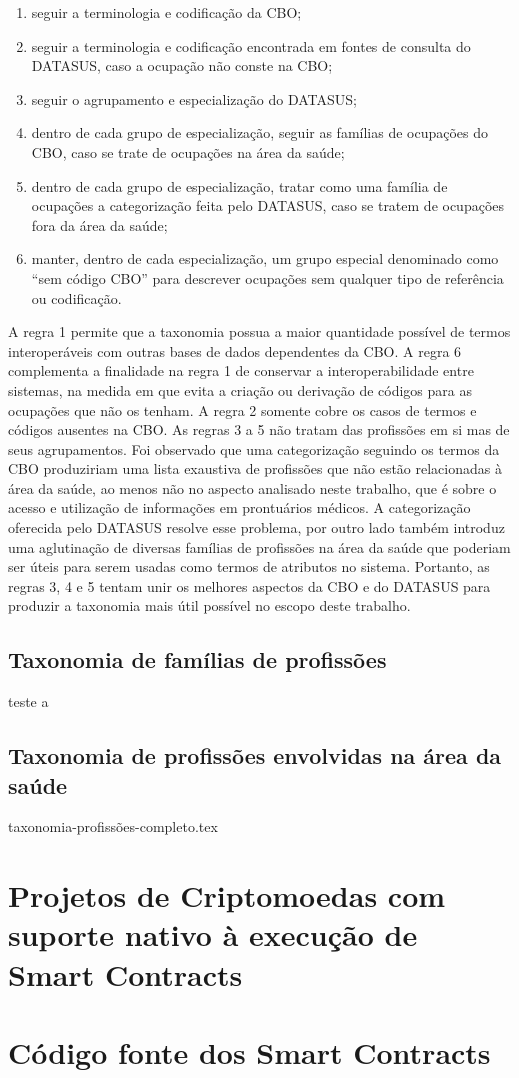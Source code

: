 \documentclass[a4paper,11pt]{article}
\begin{document}
\begin{enumerate}
  \item seguir a terminologia e codificação da CBO;
  \item seguir a terminologia e codificação encontrada em fontes de consulta do DATASUS, caso a ocupação não conste na CBO;
  \item seguir o agrupamento e especialização do DATASUS;
  \item dentro de cada grupo de especialização, seguir as famílias de ocupações do CBO, caso se trate de ocupações na área da saúde;
  \item dentro de cada grupo de especialização, tratar como uma família de ocupações a categorização feita pelo DATASUS, caso se tratem de ocupações fora da área da saúde;
  \item manter, dentro de cada especialização, um grupo especial denominado como ``sem código CBO'' para descrever ocupações sem qualquer tipo de referência ou codificação.
\end{enumerate}

A regra 1 permite que a taxonomia possua a maior quantidade possível de termos interoperáveis com outras bases de dados dependentes da CBO.
A regra 6 complementa a finalidade na regra 1 de conservar a interoperabilidade entre sistemas, na medida em que evita a criação ou derivação de códigos para as ocupações que não os tenham.
A regra 2 somente cobre os casos de termos e códigos ausentes na CBO.
As regras 3 a 5 não tratam das profissões em si mas de seus agrupamentos.
Foi observado que uma categorização seguindo os termos da CBO produziriam uma lista exaustiva de profissões que não estão relacionadas à área da saúde, ao menos não no aspecto analisado neste trabalho, que é sobre o acesso e utilização de informações em prontuários médicos.
A categorização oferecida pelo DATASUS resolve esse problema, por outro lado também introduz uma aglutinação de diversas famílias de profissões na área da saúde que poderiam ser úteis para serem usadas como termos de atributos no sistema.
Portanto, as regras 3, 4 e 5 tentam unir os melhores aspectos da CBO e do DATASUS para produzir a taxonomia mais útil possível no escopo deste trabalho.


\subsection{Taxonomia de famílias de profissões}

teste a

\subsection{Taxonomia de profissões envolvidas na área da saúde}

{taxonomia-profissões-completo.tex}

\newpage
\section{Projetos de Criptomoedas com suporte nativo à execução de Smart Contracts}
\label{app:outrasCriptomoedasSmartContracts}

\newpage
\section{Código fonte dos Smart Contracts}
\label{app:codigoSmartContracts}
\end{document}

